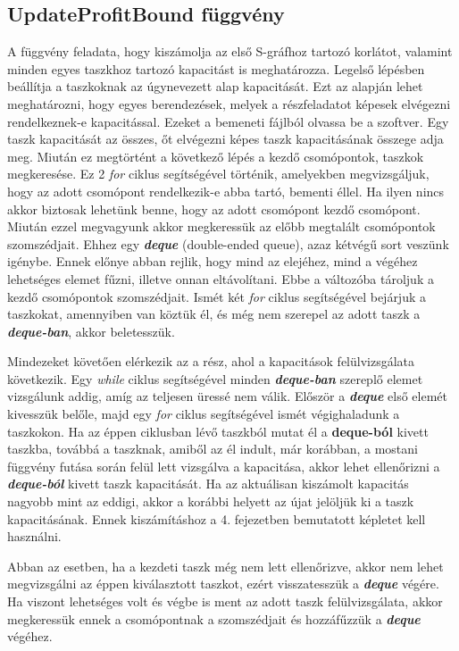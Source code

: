\subsection{UpdateProfitBound függvény}
A függvény feladata, hogy kiszámolja az első S-gráfhoz tartozó korlátot, valamint minden egyes taszkhoz tartozó kapacitást is meghatározza. Legelső lépésben beállítja a taszkoknak az úgynevezett alap kapacitását. Ezt az alapján lehet meghatározni, hogy egyes berendezések, melyek a részfeladatot képesek elvégezni rendelkeznek-e kapacitással. Ezeket a bemeneti fájlból olvassa be a szoftver. Egy taszk kapacitását az összes, őt elvégezni képes taszk kapacitásának összege adja meg. Miután ez megtörtént a következő lépés a kezdő csomópontok, taszkok megkeresése. Ez 2 \textit{for} ciklus segítségével történik, amelyekben megvizsgáljuk, hogy az adott csomópont rendelkezik-e abba tartó, bementi éllel. Ha ilyen nincs akkor biztosak lehetünk benne, hogy az adott csomópont kezdő csomópont. Miután ezzel megvagyunk akkor megkeressük az előbb megtalált csomópontok szomszédjait. Ehhez egy \textbf{\textit{deque}} (double-ended queue), azaz kétvégű sort veszünk igénybe. Ennek előnye abban rejlik, hogy mind az elejéhez, mind a végéhez lehetséges elemet fűzni, illetve onnan eltávolítani. Ebbe a változóba tároljuk a kezdő csomópontok szomszédjait. Ismét két \textit{for} ciklus segítségével bejárjuk a taszkokat, amennyiben van köztük él, és még nem szerepel az adott taszk a \textbf{\textit{deque-ban}}, akkor beletesszük.

Mindezeket követően elérkezik az a rész, ahol a kapacitások felülvizsgálata következik. Egy \textit{while} ciklus segítségével minden \textbf{\textit{deque-ban}} szereplő elemet vizsgálunk addig, amíg az teljesen üressé nem válik. Először a \textbf{\textit{deque}} első elemét kivesszük belőle, majd egy \textit{for} ciklus segítségével ismét végighaladunk a taszkokon. Ha az éppen ciklusban lévő taszkból mutat él a \textbf{deque-ból} kivett taszkba, továbbá a taszknak, amiből az él indult, már korábban, a mostani függvény futása során felül lett vizsgálva a kapacitása, akkor lehet ellenőrizni a \textbf{\textit{deque-ból}} kivett taszk kapacitását. Ha az aktuálisan kiszámolt kapacitás nagyobb mint az eddigi, akkor a korábbi helyett az újat jelöljük ki a taszk kapacitásának. Ennek kiszámításhoz a 4. fejezetben bemutatott képletet kell használni.

Abban az esetben, ha a kezdeti taszk még nem lett ellenőrizve, akkor nem lehet megvizsgálni az éppen kiválasztott taszkot, ezért visszatesszük a \textbf{\textit{deque}} végére. Ha viszont lehetséges volt és végbe is ment az adott taszk felülvizsgálata, akkor megkeressük ennek a csomópontnak a szomszédjait és hozzáfűzzük a \textbf{\textit{deque}} végéhez.


